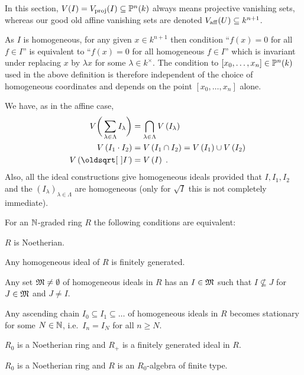 \documentclass[a4paper,parskip=half,numbers=enddot, DIV=12]{scrreprt}
\begin{document}
\begin{rem}
    \begin{alphanumerate}
        \item 
            In this section, $V(I) = V_{\mathrm{proj}}(I)\subseteq \mathbb{P}^n(k)$ always means projective vanishing sets, whereas our good old affine vanishing sets are denoted $V_{\mathrm{aff}}(U) \subseteq k^{n+1}$.
        \item 
            As $I$ is homogeneous, for any given $x\in k^{n+1}$ then condition ``$f(x)= 0$ for all $f\in I$''  is equivalent to ``$f(x) = 0$ for all homogeneous $f\in I$'' which is invariant under replacing $x$ by $\lambda x$ for some $\lambda \in k^\times$. The condition to $[x_0,\ldots,x_n]\in \mathbb{P}^n(k)$ used in the above definition is therefore independent of the choice of homogeneous coordinates and depends on the point $[x_0,\ldots, x_n]$ alone.
        \item 
            We have, as in the affine case,
            \begin{align}\lbl{eq:projectiveVanishingOp}
                \begin{split}
                V\bigg(\sum_{\lambda\in \Lambda}I_\lambda\bigg) &= \bigcap_{\lambda\in \Lambda} V\left(I_\lambda\right)\\
                \quad V\left(I_1\cdot I_2\right) &= V\left(I_1\cap I_2\right) = V\left(I_1\right)\cup V\left(I_2\right)\\
                \quad V\left(\sqrt{I}\right)&= V\left(I\right)\;.
                \end{split}
            \end{align}
            Also, all the ideal constructions give homogeneous ideals provided that $I,I_1,I_2$ and the $(I_\lambda)_{\lambda\in\Lambda}$ are homogeneous (only for $\sqrt{I}$ this is not completely immediate).
    \end{alphanumerate}
\end{rem}

\begin{prop}
    For an $\mathbb{N}$-graded ring $R$ the following conditions are equivalent:
    \begin{alphanumerate}
        \item 
            $R$ is Noetherian.
        \item 
            Any homogeneous ideal of $R$ is finitely generated.
        \item
            Any set $\mathfrak{M}\neq \emptyset$ of homogeneous ideals in $R$ has an $I\in \mathfrak{M}$ such that $I\not\subseteq J$ for $J\in \mathfrak{M}$ and $J\neq I$.
        \item 
            Any ascending chain $I_0\subseteq I_1\subseteq \ldots$ of homogeneous ideals in $R$ becomes stationary for some $N\in\mathbb{N}$, i.e.\ $I_n = I_N$ for all $n\geq N$.
        \item 
            $R_0$ is a Noetherian ring and $R_+$ is a finitely generated ideal in $R$.
        \item 
            $R_0$ is a Noetherian ring and $R$ is an $R_0$-algebra of finite type.
    \end{alphanumerate}
\end{prop}
\end{document}

